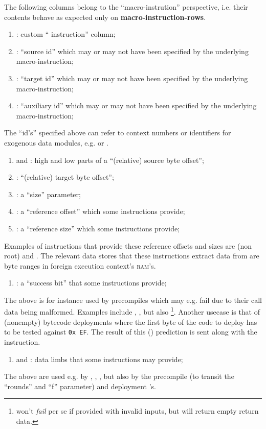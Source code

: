 The following columns belong to the ``macro-instrution'' perspective, i.e. their contents behave as expected only on 
\textbf{macro-instruction-rows}. 
\begin{enumerate}
	\item \macroInst{}:
		custom ``\mmuMod{} instruction'' column;
	\item \macroSrcId{}:
		``source id'' which may or may not have been specified by the underlying macro-instruction;
	\item \macroTgtId{}:
		``target id'' which may or may not have been specified by the underlying macro-instruction;
	\item \macroAuxId{}:
		``auxiliary id'' which may or may not have been specified by the underlying macro-instruction;
\end{enumerate}
The ``id's'' specified above can refer to context numbers or identifiers for exogenous data modules, e.g. \kecStamp{} or \cfi{}.
\begin{enumerate}[resume]
	\item \macroSrcOffsetHi{} and \macroSrcOffsetLo{}:
		high and low parts of a ``(relative) source byte offset'';
	\item \macroTgtOffsetLo{}:
		``(relative) target byte offset'';
	\item \macroSize{}:
		a ``size'' parameter;
	\item \macroRefOffset{}:
		a ``reference offset'' which some instructions provide;
	\item \macroRefSize{}:  
		a ``reference size'' which some instructions provide;
\end{enumerate}
Examples of instructions that provide these reference offsets and sizes are (non root)  and .
The relevant data stores that these instructions extract data from are byte ranges in foreign execution context's \textsc{ram}'s.
\begin{enumerate}[resume]
	\item \macroSuccessBit{}:
		a ``success bit'' that some instructions provide;
\end{enumerate}
The above is for instance used by precompiles which may e.g. fail due to their call data being malformed.
Examples include , ,  but also \footnote{ won't \emph{fail} per se if provided with invalid inputs, but will return empty return data.}.
Another usecase is that of (nonempty) bytecode deployments where the first byte of the code to deploy has to be tested against \texttt{0x\,EF}.
The result of this (\hubMod{}) prediction is sent along with the \mmuMod{} instruction.
\begin{enumerate}[resume]
	\item \macroLimbOne{} and \macroLimbTwo{}:
		data limbs that some instructions may provide;
\end{enumerate}
The above are used e.g. by
,
,
,
but also by the  precompile (to transit the ``rounds'' and ``f'' parameter)
and deployment 's.

